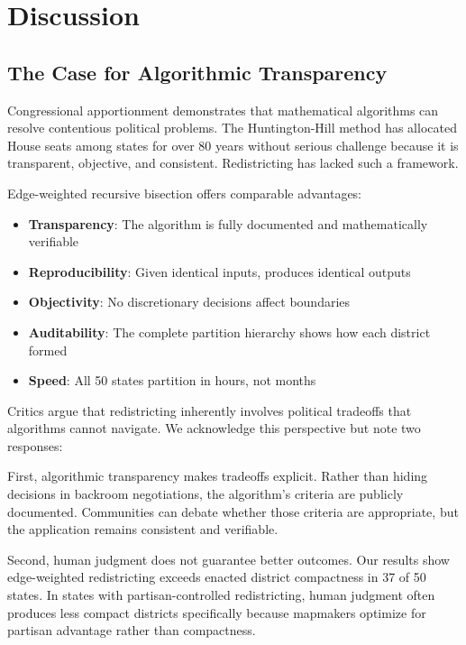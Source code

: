 \section{Discussion}

\subsection{The Case for Algorithmic Transparency}

Congressional apportionment demonstrates that mathematical algorithms can resolve contentious political problems. The Huntington-Hill method has allocated House seats among states for over 80 years without serious challenge because it is transparent, objective, and consistent. Redistricting has lacked such a framework.

Edge-weighted recursive bisection offers comparable advantages:

\begin{itemize}
\item \textbf{Transparency}: The algorithm is fully documented and mathematically verifiable
\item \textbf{Reproducibility}: Given identical inputs, produces identical outputs
\item \textbf{Objectivity}: No discretionary decisions affect boundaries
\item \textbf{Auditability}: The complete partition hierarchy shows how each district formed
\item \textbf{Speed}: All 50 states partition in hours, not months
\end{itemize}

Critics argue that redistricting inherently involves political tradeoffs that algorithms cannot navigate. We acknowledge this perspective but note two responses:

First, algorithmic transparency makes tradeoffs explicit. Rather than hiding decisions in backroom negotiations, the algorithm's criteria are publicly documented. Communities can debate whether those criteria are appropriate, but the application remains consistent and verifiable.

Second, human judgment does not guarantee better outcomes. Our results show edge-weighted redistricting exceeds enacted district compactness in 37 of 50 states. In states with partisan-controlled redistricting, human judgment often produces less compact districts specifically because mapmakers optimize for partisan advantage rather than compactness.

